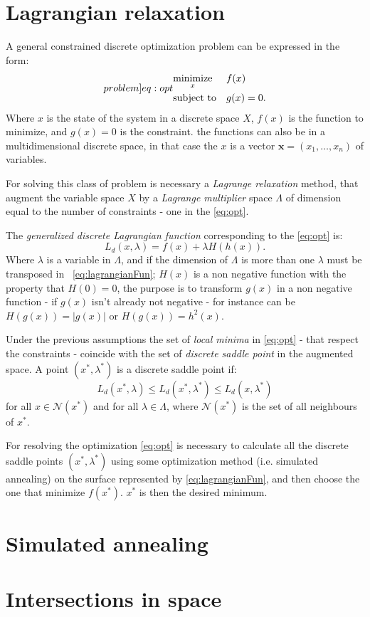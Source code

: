 \documentclass[dissertation.tex]{subfiles}
\begin{document}
\section{Lagrangian relaxation}\label{sec:lagrangianRelaxation}
A general constrained discrete optimization problem can be expressed in
the form:
\begin{equation}\label[problem]{eq:opt}
\begin{aligned}
& \underset{x}{\text{minimize}}
& & f(x) \\
& \text{subject to}
& & g(x)=0.
\end{aligned}
\end{equation}
Where $x$ is the state of the system in a discrete space $X$, $f(x)$
is the function to
minimize, and $g(x)=0$ is the constraint. the functions can also be
in a multidimensional discrete space, in that case the $x$ is a vector
$\mathbf{x}=(x_1,\dots,x_n)$ of variables.

For solving this class
of problem is necessary a \emph{Lagrange relaxation} method, that
augment the variable space $X$ by a \emph{Lagrange multiplier} space
$\Lambda$ of dimension equal to the number of constraints - one in the
\cref{eq:opt}.

The \emph{generalized discrete Lagrangian
  function} corresponding to the \cref{eq:opt} is:
\begin{equation}\label{eq:lagrangianFun}
  L_d(x,\lambda)=f(x)+\lambda H(h(x)).
\end{equation}
Where $\lambda$ is a variable in $\Lambda$, and if the dimension of
$\Lambda$ is more than one $\lambda$ must be transposed in
~\cref{eq:lagrangianFun}; $H(x)$ is a non negative function
with the property that $H(0)=0$, the purpose is to transform $g(x)$ in
a non negative function - if $g(x)$ isn't already not negative - for
instance can be $H(g(x))=|g(x)|$ or $H(g(x))=h^2(x)$.

Under the previous assumptions the set of \emph{local minima}
in \cref{eq:opt} - that respect the constraints -  coincide
with the set of \emph{discrete saddle point}
in the augmented space. A point $(x^*,\lambda^*)$ is a discrete saddle
point if:
\begin{equation*}
  L_d(x^*,\lambda)\leq L_d(x^*,\lambda^*)\leq L_d(x,\lambda^*)
\end{equation*}
for all $x\in\mathcal{N}(x^*)$ and for all $\lambda\in\Lambda$, where
$\mathcal{N}(x^*)$ is the set of all neighbours of $x^*$.

For resolving the optimization \cref{eq:opt} is necessary to
calculate all the discrete saddle points $(x^*,\lambda^*)$ using some
optimization method (i.e. simulated annealing) on the surface
represented by
\cref{eq:lagrangianFun}, and then choose
the one that minimize $f(x^*)$. $x^*$ is then the desired minimum.

\section{Simulated annealing}

\section{Intersections in space}\label{sec:intersections}
\end{document}
